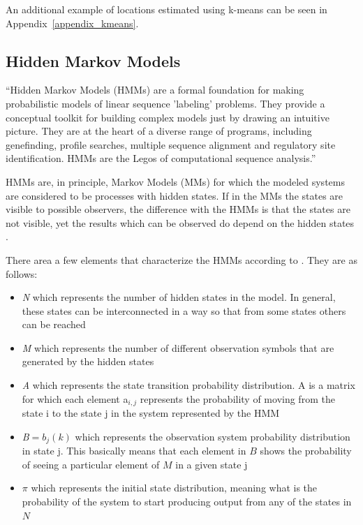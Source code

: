 An additional example of locations estimated using
k-means can be seen in Appendix~\ref{appendix_kmeans}.

\subsection{Hidden Markov Models}
\label{hmm_section}

``Hidden Markov Models (HMMs) are a formal foundation for making probabilistic
models of linear sequence 'labeling' problems. They provide a conceptual
toolkit for building complex models just by drawing an intuitive picture. They
are at the heart of a diverse range of programs, including genefinding, profile
searches, multiple sequence alignment and regulatory site identification. HMMs
are the Legos of computational sequence analysis.''\cite{JOUR} 

HMMs are, in principle, Markov Models (MMs) \cite{opac-b1082850} for which the
modeled systems are considered to be processes with hidden states. If in the
MMs the states are visible to possible observers, the difference with the HMMs
is that the states are not visible, yet the results which can be observed do depend
on the hidden states \cite{18626}.

There area a few elements that characterize the HMMs according to \cite{18626}.
They are as follows:
\begin{itemize}
  \item \textit{N} which represents the number of hidden states in the model. In
  general, these states can be interconnected in a way so that from some states others
  can be reached
  \item \textit{M} which represents the number of different observation symbols
  that are generated by the hidden states
  \item \textit{A} which represents the state transition probability distribution. A is a
  matrix for which each element a$_{i,j}$ represents the probability of moving
  from the state i to the state j in the system represented by the HMM
  \item \textit{B}$ = {b_{j}(k)}$ which represents the observation system probability
  distribution in state j. This basically means that each element in $B$ shows
  the probability of seeing a particular element of $M$ in a given state j
  \item $\pi$ which represents the initial state distribution, meaning what is
  the probability of the system to start producing output from any of the states in
  $N$
\end{itemize}

